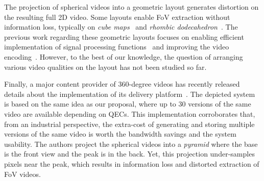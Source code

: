 The projection of spherical videos into a geometric layout generates
distortion on the resulting
full 2D video. Some layouts enable \ac{FoV} extraction without information
loss, typically on \emph{cube maps}~\cite{Ng2005} and
\emph{rhombic dodecahedron}~\cite{fu_rhombic_2009}. The previous work regarding
these
geometric layouts focuses on enabling efficient implementation of signal processing
functions~\cite{kazhdan_metric-aware_2010} and improving the video
encoding~\cite{tosic_low_2009}.
However, to the best of our knowledge, the
question of arranging various video qualities on the layout has not been studied so far.

Finally, a major content provider of 360-degree videos has recently released details about the
implementation of its delivery platform~\cite{facebook}. The depicted system is based
on the same idea as our proposal, where up to 30 versions of the same video are available depending on
\acp{QEC}. This implementation corroborates that, from an industrial perspective, the
extra-cost of
generating and storing multiple versions of the same video is worth the bandwidth
savings and the system usability. The authors project the spherical videos into a \emph{pyramid}
where the
base is the front
view and the peak is in the back. Yet, this projection under-samples pixels near the peak,
which
results in
information loss and distorted extraction of \ac{FoV} videos. 

%
%
%
%



